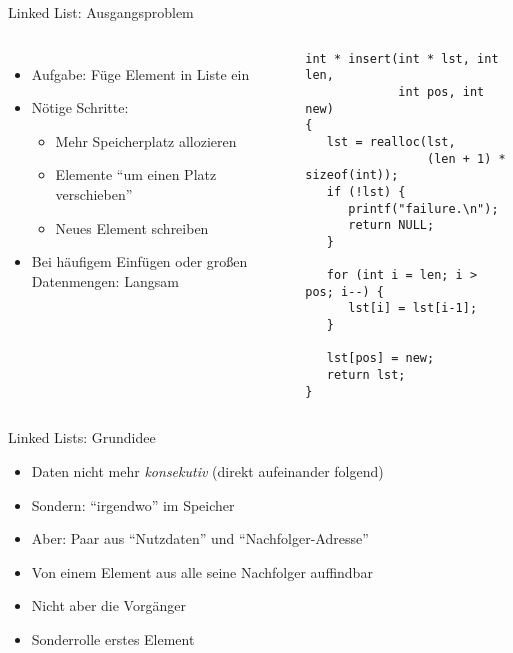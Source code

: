 
\begin{frame}[fragile]{Linked List: Ausgangsproblem}
%
\begin{columns}[T]
\vspace{-6pt}
\begin{itemize}
\item Aufgabe: Füge Element in Liste ein
\item Nötige Schritte:
	\begin{itemize}
	\item Mehr Speicherplatz allozieren
	\item Elemente \enquote{um einen Platz verschieben}
	\item Neues Element schreiben
	\end{itemize}
\item Bei häufigem Einfügen oder großen Datenmengen: Langsam
\end{itemize}
%
\vspace{-15pt}
\begin{codebox}
\begin{verbatim}
int * insert(int * lst, int len,
             int pos, int new)
{
   lst = realloc(lst, 
                 (len + 1) * sizeof(int));
   if (!lst) {
      printf("failure.\n"); 
      return NULL;
   }
   
   for (int i = len; i > pos; i--) {
      lst[i] = lst[i-1];
   }
   
   lst[pos] = new;
   return lst;
}
\end{verbatim}
\end{codebox}
\end{columns}

%
\end{frame}


\begin{frame}{Linked Lists: Grundidee}
%
\begin{itemize}
\item Daten nicht mehr \emph{konsekutiv} (direkt aufeinander folgend)
\item Sondern: \enquote{irgendwo} im Speicher
\item Aber: Paar aus \enquote{Nutzdaten} und \enquote{Nachfolger-Adresse}
\item[\Thus] Von einem Element aus alle seine Nachfolger auffindbar
\item[\Thus] Nicht aber die Vorgänger
\item[\Thus] Sonderrolle erstes Element
\end{itemize}
%
\end{frame}

